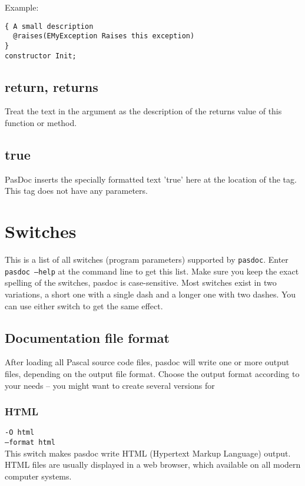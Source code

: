 \documentclass[11pt]{article}
\begin{document}
Example:
\begin{verbatim}
{ A small description 
  @raises(EMyException Raises this exception)
}  
constructor Init;
\end{verbatim}

\subsection{return, returns}

Treat the text in the argument as the description of the returns
value of this function or method. 

\subsection{true}

PasDoc inserts the specially formatted text 'true' here
at the location of the tag. This tag does not have any
parameters.

\section{Switches}

This is a list of all switches (program parameters) supported by {\tt pasdoc}.
Enter {\tt pasdoc --help} at the command line to get this list.
Make sure you keep the exact spelling of the switches, pasdoc is case-sensitive.
Most switches exist in two variations, a short one with a single dash and
a longer one with two dashes.
You can use either switch to get the same effect.

\subsection{Documentation file format}

After loading all Pascal source code files, pasdoc will write one or more
output files, depending on the output file format.
Choose the output format according to your needs -- you might want to create
several versions for 

\subsubsection{HTML}

{\tt -O html}\\
{\tt --format html}\\

This switch makes pasdoc write HTML (Hypertext Markup Language) output.
HTML files are usually displayed in a web browser, which available on
all modern computer systems. 
\end{document}
